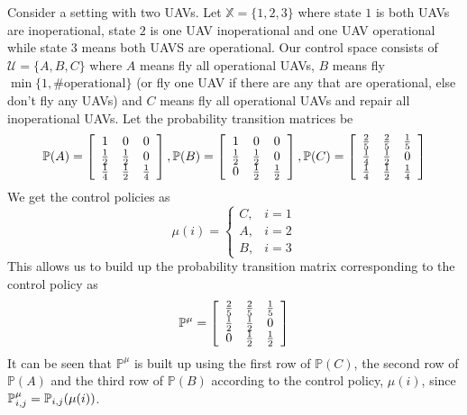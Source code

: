 \documentclass[lecture,12pt,]{pcms-l}
\begin{document}
\begin{example}
Consider a setting with two UAVs. Let $\mathbb{X}=\{1,2,3\}$ where state $1$ is both UAVs are inoperational, state $2$ is one UAV inoperational and one UAV operational while state $3$ means both UAVS are operational. Our control space consists of $\mathcal{U} = \{A,B,C\}$ where $A$ means fly all operational UAVs, $B$ means fly $\min\{1, \#\text{operational}\}$ (or fly one UAV if there are any that are operational, else don't fly any UAVs) and $C$ means fly all operational UAVs and repair all inoperational UAVs. Let the probability transition matrices be
\begin{align*}
\begin{split}
\mathbb{P}(A) = \left[\begin{array}{c c c} 1 & 0 & 0 \\ \frac{1}{2} & \frac{1}{2} & 0 \\ \frac{1}{4} & \frac{1}{2} & \frac{1}{4} \end{array}\right],
\mathbb{P}(B) = \left[\begin{array}{c c c} 1 & 0 & 0 \\ \frac{1}{2} & \frac{1}{2} & 0 \\ 0 & \frac{1}{2} & \frac{1}{2} \end{array}\right],
\mathbb{P}(C) = \left[\begin{array}{c c c} \frac{2}{5} & \frac{2}{5} & \frac{1}{5} \\ \frac{1}{4} & \frac{1}{2} & 0 \\ \frac{1}{4} & \frac{1}{2} & \frac{1}{4} \end{array}\right]
\end{split}
\end{align*}
We get the control policies as
$$\mu(i) = \begin{cases} C, & i=1 \\ A, & i=2 \\ B, & i=3 \end{cases}$$
This allows us to build up the probability transition matrix corresponding to the control policy as
$$\mathbb{P}^\mu = \left[\begin{array}{c c c} \frac{2}{5} & \frac{2}{5} & \frac{1}{5} \\ \frac{1}{2} & \frac{1}{2} & 0 \\ 0 & \frac{1}{2} & \frac{1}{2} \end{array}\right]$$
It can be seen that $\mathbb{P}^\mu$ is built up using the first row of $\mathbb{P}(C)$, the second row of $\mathbb{P}(A)$ and the third row of $\mathbb{P}(B)$ according to the control policy, $\mu(i)$, since $\mathbb{P}_{i,j}^\mu=\mathbb{P}_{i,j}(\mu(i))$.


\end{example}
\end{document}
